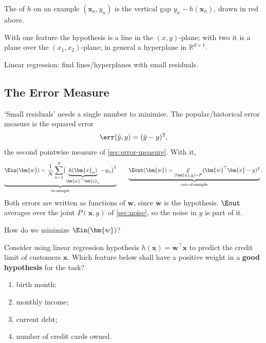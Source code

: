 \begin{definition}[Residual]\label{def:residual}
    The  of \(h\) on an example \((\bm{x}_n, y_n)\) is the
    vertical gap \(y_n - h(\bm{x}_n)\), drawn in red above.
\end{definition}

With one feature the hypothesis is a line in the \((x, y)\)-plane; with two it
is a plane over the \((x_1, x_2)\)-plane; in general a hyperplane in
\(\mathbb{R}^{d+1}\).

\begin{moral}
    Linear regression: find lines/hyperplanes with small residuals.
\end{moral}

\subsection{The Error Measure}

`Small residuals' needs a single number to minimise. The popular/historical
error measure is the squared error
\[
    \err(\hat{y}, y) = (\hat{y} - y)^2 ,
\]
the second pointwise measure of \autoref{sec:error-measure}. With it,
\[
    \underbrace{\Ein(\bm{w}) = \frac{1}{N} \sum_{n=1}^N
    \bigl( \underbrace{h(\bm{x}_n)}_{\bm{w}^\top \bm{x}_n} - y_n
    \bigr)^2}_{\text{in-sample}}
    \qquad
    \underbrace{\Eout(\bm{w}) = \mathop{\mathcal{E}}_{(\bm{x}, y) \sim P}
    (\bm{w}^\top \bm{x} - y)^2}_{\text{out-of-sample}} .
\]
Both errors are written as functions of \(\bm{w}\), since \(\bm{w}\) is the
hypothesis. \(\Eout\) averages over the joint \(P(\bm{x}, y)\) of
\autoref{sec:noise}, so the noise in \(y\) is part of it.

\begin{question}
    How do we minimize \(\Ein(\bm{w})\)?
\end{question}

\begin{exercise}
    Consider using linear regression hypothesis \(h(\bm{x}) = \bm{w}^\top
    \bm{x}\) to predict the credit limit of customers \(\bm{x}\). Which feature
    below shall have a positive weight in a \textbf{good hypothesis} for the
    task?
    \begin{enumerate}[(1)]
        \item birth month;
        \item monthly income;
        \item current debt;
        \item number of credit cards owned.
    \end{enumerate}
\end{exercise}


